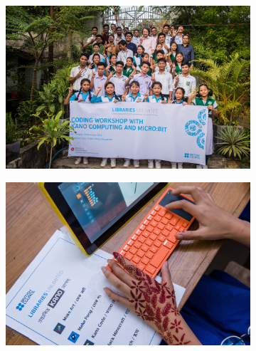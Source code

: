 \documentclass[12pt]{report} %
\begin{document}
\begin{figure}[t!]
        \begin{subfigure}[]{0.46\textwidth}
        \centering
        \includegraphics[width=1.0\textwidth]{rang1}
    \end{subfigure}
    \begin{subfigure}[]{0.46\textwidth}
        \centering
        \includegraphics[width=1.0\textwidth]{rang3}
    \end{subfigure}


\end{figure}
\end{document}
